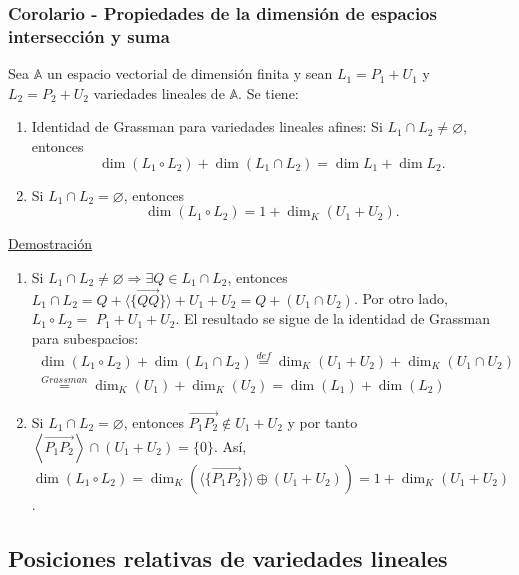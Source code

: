 \documentclass[12pt, a4paper, ones, notitlepage, openany,titlepage]{article}
\begin{document}
\subsubsection{Corolario - Propiedades de la dimensión de espacios intersección y suma}
Sea $\mathbb{A}$ un espacio vectorial de dimensión finita y sean $L_{1}=P_{1}+U_{1}$ y $L_{2}=P_{2}+U_{2}$ variedades lineales de $\mathbb{A}$. Se tiene:
\begin{enumerate}[label=(\arabic*)]
\item Identidad de Grassman para variedades lineales afines: Si $L_{1} \cap L_{2} \neq \varnothing$, entonces
$$
\dim \left(L_{1} \circ L_{2}\right)+\dim \left(L_{1} \cap L_{2}\right)=\dim  L_{1}+\dim  L_{2} .
$$

\item Si $L_{1} \cap L_{2}=\varnothing$, entonces
$$
\dim \left(L_{1} \circ L_{2}\right)=1+\dim _{K}\left(U_{1}+U_{2}\right) .
$$
\end{enumerate}
\noindent\underline{Demostración}
\begin{enumerate}[label=(\arabic*)]
\item Si $L_{1} \cap L_{2} \neq \varnothing \Longrightarrow \exists Q \in L_{1} \cap L_{2}$, entonces $L_{1} \cap L_{2} = Q + \langle \{\overrightarrow{QQ}\} \rangle + U_1 + U_2 = Q+\left(U_{1} \cap U_{2}\right)$. Por otro lado, $L_{1} \circ L_{2}=$ $P_{1}+U_{1}+U_{2}$. El resultado se sigue de la identidad de Grassman para subespacios:
\begin{gather*}
\dim  (L_1 \circ L_2) + \dim  (L_1 \cap L_2) \overset{def}{=} \dim _K (U_1 + U_2) + \dim _K (U_1 \cap U_2) \\ \overset{Grassman}{=} \dim _K (U_1) + \dim _K (U_2) = \dim  (L_1) + \dim  (L_2)
\end{gather*}

\item Si $L_{1} \cap L_{2}=\varnothing$, entonces $\overrightarrow{P_{1} P_{2}} \notin U_{1}+U_{2}$ y por tanto $\left\langle\overrightarrow{P_{1} P_{2}}\right\rangle \cap\left(U_{1}+U_{2}\right)=\{0\}$. Así, $\dim \left(L_{1} \circ L_{2}\right) = \dim _K \left(\langle\{\overrightarrow{P_1 P_2}\} \rangle \oplus (U_1 + U_2)\right) =1+\dim _{K}\left(U_{1}+U_{2}\right)$.
\end{enumerate}

\subsection{Posiciones relativas de variedades lineales}
\end{document}
